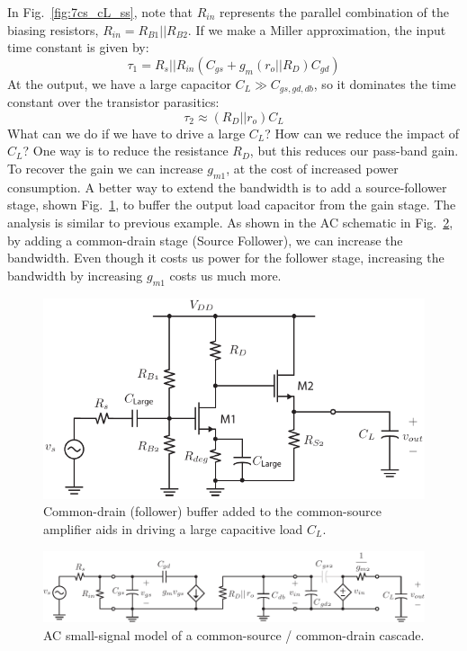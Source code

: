 In Fig.~\ref{fig:7cs_cL_ss}, note that $R_{in}$ represents the parallel combination of the biasing resistors, $R_{in} = R_{B1} || R_{B2}$.  If we make a Miller approximation, the input time constant is given by:
%
 \begin{equation}
	\tau_1 = R_s || R_{in} (C_{gs} + g_m (r_o||R_D) C_{gd} )
\end{equation}
%
At the output, we have a large capacitor $C_L \gg C_{gs,gd,db}$, so it dominates the time constant over the transistor parasitics:
%
 \begin{equation}
	\tau_2 \approx (R_D|| r_o) C_L 
\end{equation}
%
What can we do if we have to drive a large $C_L$?  How can we reduce the impact of $C_L$? One way is to reduce the resistance $R_D$, but this reduces our pass-band gain.   To recover the gain we can increase $g_{m1}$, at the cost of increased power consumption.   A better way to extend the bandwidth is to add a source-follower stage, shown Fig.~\ref{fig:8_cs_cd_casc_dc}, to buffer the output load capacitor from the gain stage.  The analysis is similar to previous example.  As shown in the AC schematic in Fig.~\ref{fig:9cs_cd_casc_ss}, by adding a common-drain stage (Source Follower), we can increase the bandwidth. Even though it costs us power for the follower stage, increasing the bandwidth by increasing $g_{m1}$ costs us much more.


\begin{figure}[tb]
\begin{center}
\includegraphics[scale=1]{8_cs_cd_casc_dc}
\end{center}
\caption{Common-drain (follower) buffer added to the common-source amplifier aids in driving a large capacitive load $C_L$.} \label{fig:8_cs_cd_casc_dc}
\end{figure}


\begin{figure}[tb]
\begin{center}
\includegraphics[scale=1]{9cs_cd_casc_ss}
\end{center}
\caption{AC small-signal model of a common-source / common-drain cascade.} \label{fig:9cs_cd_casc_ss}
\end{figure}


